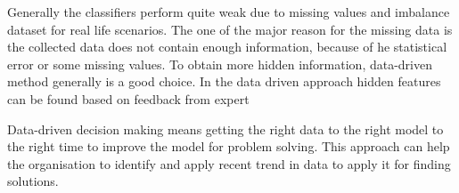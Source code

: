 Generally the classifiers perform quite weak due to missing values and imbalance dataset for real life scenarios. The one of the major reason for the missing data is the collected data does not contain enough information, because of he statistical error or some missing values. To obtain more hidden
information, data-driven method generally is a good choice. In the data driven approach hidden features can be found based on feedback from expert

Data-driven decision making means getting the right data to the right model to the right time to improve the model for problem solving. This approach can help the organisation to identify and apply recent trend in data to apply it for finding solutions. 


